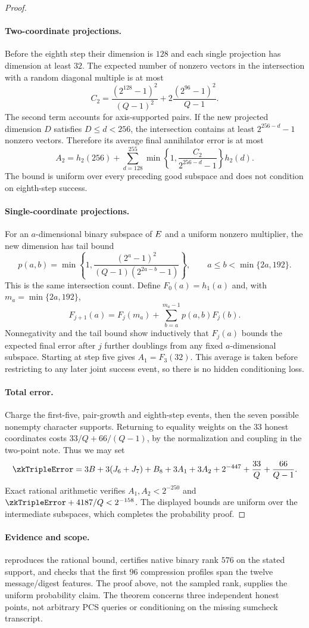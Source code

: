 \begin{proof}
\paragraph{Two-coordinate projections.} Before the eighth step their dimension is $128$ and each single projection has dimension at least $32$. The expected number of nonzero vectors in the intersection with a random diagonal multiple is at most
\[
 C_2=\frac{(2^{128}-1)^2}{(Q-1)^2}
       +2\frac{(2^{96}-1)^2}{Q-1}.
\]
The second term accounts for axis-supported pairs. If the new projected dimension $D$ satisfies $D\le d<256$, the intersection contains at least $2^{256-d}-1$ nonzero vectors. Therefore its average final annihilator error is at most
\[
 A_2=h_2(256)+\sum_{d=128}^{255}
       \min\!\left\{1,\frac{C_2}{2^{256-d}-1}\right\}h_2(d).
\]
The bound is uniform over every preceding good subspace and does not condition on eighth-step success.

\paragraph{Single-coordinate projections.} For an $a$-dimensional binary subspace of $E$ and a uniform nonzero multiplier, the new dimension has tail bound
\[
 p(a,b)=\min\!\left\{1,
  \frac{(2^a-1)^2}{(Q-1)(2^{2a-b}-1)}\right\},
 \qquad a\le b<\min\{2a,192\}.
\]
This is the same intersection count. Define $F_0(a)=h_1(a)$ and, with $m_a=\min\{2a,192\}$,
\[
 F_{j+1}(a)=F_j(m_a)+\sum_{b=a}^{m_a-1}p(a,b)F_j(b).
\]
Nonnegativity and the tail bound show inductively that $F_j(a)$ bounds the expected final error after $j$ further doublings from any fixed $a$-dimensional subspace. Starting at step five gives $A_1=F_3(32)$. This average is taken before restricting to any later joint success event, so there is no hidden conditioning loss.

\paragraph{Total error.} Charge the first-five, pair-growth and eighth-step events, then the seven possible nonempty character supports. Returning to equality weights on the $33$ honest coordinates costs $33/Q+66/(Q-1)$, by the normalization and coupling in the two-point note. Thus we may set
\[
 \zkTripleError={}
 3B+3(J_6+J_7)+B_8+3A_1+3A_2+2^{-447}
 +\frac{33}{Q}+\frac{66}{Q-1}.
\]
Exact rational arithmetic verifies $A_1,A_2<2^{-250}$ and $\zkTripleError+4187/Q<2^{-158}$. The displayed bounds are uniform over the intermediate subspaces, which completes the probability proof.
\end{proof}

\paragraph{Evidence and scope.}  reproduces the rational bound, certifies native binary rank $576$ on the stated support, and checks that the first $96$ compression profiles span the twelve message/digest features. The proof above, not the sampled rank, supplies the uniform probability claim. The theorem concerns three independent honest points, not arbitrary PCS queries or conditioning on the missing sumcheck transcript.
